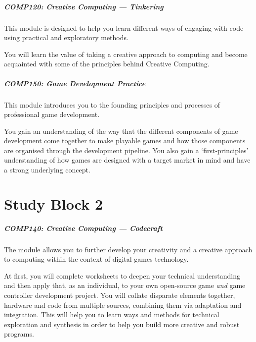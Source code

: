 \begin{frame}
	\frametitle{\Large{COMP120: Creative Computing --- Tinkering}}
	
	This module is designed to help you learn different ways of engaging with code using practical and exploratory methods. 
	
	\vspace{2em}
	
	You will learn the value of taking a creative approach to computing and become acquainted with some of the principles behind Creative Computing. 

\end{frame}

\begin{frame}
	\frametitle{\Large{COMP150: Game Development Practice}}
	
	This module introduces you to the founding principles and processes of professional game development. 
	
	\vspace{2em}
	
	You gain an understanding of the way that the different components of game development come together to make playable games and how those components are organised through the development pipeline. You also gain a `first-principles' understanding of how games are designed with a target market in mind and have a strong underlying concept.

\end{frame}

\part{Study Block 2}
\frame{\partpage}

\begin{frame}
	\frametitle{\Large{COMP140: Creative Computing --- Codecraft}}
	
	The module allows you to further develop your creativity and a creative approach to computing within the context of digital games technology.
	
	\vspace{2em}
	
	At first, you will complete worksheets to deepen your technical understanding and then apply that, as an individual, to your own open-source game \textit{and} game controller development project. You will collate disparate elements together, hardware and code from multiple sources, combining them via adaptation and integration. This will help you to learn ways and methods for technical exploration and synthesis in order to help you build more creative and robust programs. 

\end{frame}

